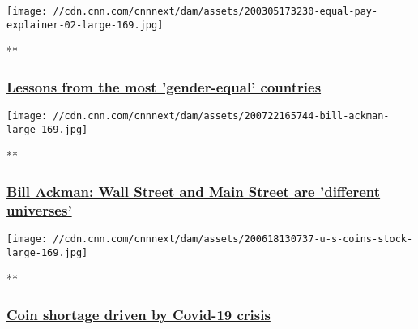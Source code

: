 \href{/videos/business/2020/03/05/how-countries-can-close-the-global-gender-gap-suffrage-orig.cnn/video/playlists/business-economy/}{}

\texttt{[image: //cdn.cnn.com/cnnnext/dam/assets/200305173230-equal-pay-explainer-02-large-169.jpg]}

**

\hypertarget{lessons-from-the-most-gender-equal-countries}{%
\subsubsection{\texorpdfstring{\href{/videos/business/2020/03/05/how-countries-can-close-the-global-gender-gap-suffrage-orig.cnn/video/playlists/business-economy/}{Lessons
from the most 'gender-equal'
countries}}{Lessons from the most 'gender-equal' countries}}\label{lessons-from-the-most-gender-equal-countries}}

\href{/videos/business/2020/07/22/bill-ackman-spac-orig.cnn-business/video/playlists/business-economy/}{}

\texttt{[image: //cdn.cnn.com/cnnnext/dam/assets/200722165744-bill-ackman-large-169.jpg]}

**

\hypertarget{bill-ackman-wall-street-and-main-street-are-different-universes}{%
\subsubsection{\texorpdfstring{\href{/videos/business/2020/07/22/bill-ackman-spac-orig.cnn-business/video/playlists/business-economy/}{Bill
Ackman: Wall Street and Main Street are 'different
universes'}}{Bill Ackman: Wall Street and Main Street are 'different universes'}}\label{bill-ackman-wall-street-and-main-street-are-different-universes}}

\href{/videos/business/2020/07/22/coin-shortage-coronavirus.cnnbusiness/video/playlists/business-economy/}{}

\texttt{[image: //cdn.cnn.com/cnnnext/dam/assets/200618130737-u-s-coins-stock-large-169.jpg]}

**

\hypertarget{coin-shortage-driven-by-covid-19-crisis}{%
\subsubsection{\texorpdfstring{\href{/videos/business/2020/07/22/coin-shortage-coronavirus.cnnbusiness/video/playlists/business-economy/}{Coin
shortage driven by Covid-19
crisis}}{Coin shortage driven by Covid-19 crisis}}\label{coin-shortage-driven-by-covid-19-crisis}}

